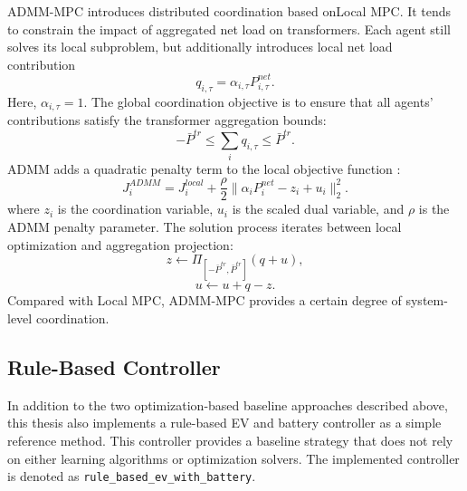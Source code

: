 ADMM-MPC introduces distributed coordination based onLocal MPC. It tends to constrain the impact of aggregated net load on transformers. Each agent still solves its local subproblem, but additionally introduces local net load contribution
\[
  q_{i,\tau}=\alpha_{i,\tau}P^{net}_{i,\tau}.
\]
Here, \(\alpha_{i,\tau}=1\). The global coordination objective is to ensure that all agents' contributions satisfy the transformer aggregation bounds:
\[
  -\bar P^{tr}
  \le
  \sum_i q_{i,\tau}
  \le
  \bar P^{tr}.
\]
ADMM adds a quadratic penalty term to the local objective function :
\[
  J_i^{ADMM}
  =
  J_i^{local}
  +
  \frac{\rho}{2}
  \|\alpha_iP^{net}_i-z_i+u_i\|_2^2.
\]
where \(z_i\) is the coordination variable, \(u_i\) is the scaled dual variable, and \(\rho\) is the ADMM penalty parameter. The solution process iterates between local optimization and aggregation projection:
\[
  z\leftarrow \Pi_{[-\bar P^{tr},\bar P^{tr}]}(q+u),
\]
\[
  u\leftarrow u+q-z.
\]
Compared with Local MPC, ADMM-MPC provides a certain degree of system-level coordination.

\subsection{Rule-Based Controller}

In addition to the two optimization-based baseline approaches described above, this thesis also implements a rule-based EV and battery controller as a simple reference method. This controller provides a baseline strategy that does not rely on either learning algorithms or optimization solvers. The implemented controller is denoted as \texttt{rule\_based\_ev\_with\_battery}.

